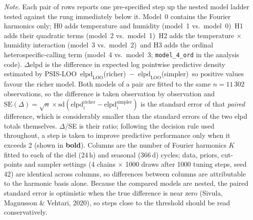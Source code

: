 \begin{table}[htbp]
\begin{minipage}{\linewidth}
\textit{Note.} Each pair of rows reports one pre-specified step up the nested model ladder\, tested against the rung immediately below it. Model~0 contains the Fourier harmonics only; H0 adds temperature and humidity (model~1 vs.\ model~0)\, H1 adds their quadratic terms (model~2 vs.\ model~1)\, H2 adds the temperature $\times$ humidity interaction (model~3 vs.\ model~2)\, and H3 adds the ordinal heterospecific-calling term (model~4 vs.\ model~3; \texttt{model\_4\_ord} in the analysis code). $\Delta$elpd is the difference in expected log pointwise predictive density estimated by PSIS-LOO\, $\mathrm{elpd}_{\mathrm{LOO}}$(richer)~$-$~$\mathrm{elpd}_{\mathrm{LOO}}$(simpler)\, so positive values favour the richer model. Both models of a pair are fitted to the same $n=11\,302$ observations, so the difference is taken observation by observation and $\mathrm{SE}(\Delta)=\sqrt{n}\times\mathrm{sd}(\mathrm{elpd}_i^{\mathrm{richer}}-\mathrm{elpd}_i^{\mathrm{simpler}})$ is the standard error of that \emph{paired} difference, which is considerably smaller than the standard errors of the two elpd totals themselves. $\Delta$/SE is their ratio; following the decision rule used throughout, a step is taken to improve predictive performance only when it exceeds 2 (shown in \textbf{bold}). Columns are the number of Fourier harmonics $K$ fitted to each of the diel (24\,h) and seasonal (366\,d) cycles; data, priors, cut-points and sampler settings (4 chains $\times$ 1000 draws after 1000 tuning steps, seed 42) are identical across columns, so differences between columns are attributable to the harmonic basis alone. Because the compared models are nested, the paired standard error is optimistic when the true difference is near zero (Sivula, Magnusson \& Vehtari, 2020), so steps close to the threshold should be read conservatively.
\end{minipage}
\end{table}